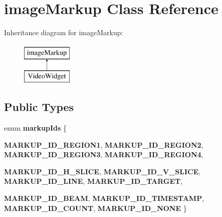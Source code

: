 \hypertarget{classimageMarkup}{
\section{imageMarkup Class Reference}
\label{classimageMarkup}
}
Inheritance diagram for imageMarkup:\begin{figure}[H]
\begin{center}
\leavevmode
\includegraphics[height=2.000000cm]{classimageMarkup}
\end{center}
\end{figure}
\subsection*{Public Types}
\begin{DoxyCompactItemize}
\item 
enum {\bfseries markupIds} \{ \par
{\bfseries MARKUP\_\-ID\_\-REGION1}, 
{\bfseries MARKUP\_\-ID\_\-REGION2}, 
{\bfseries MARKUP\_\-ID\_\-REGION3}, 
{\bfseries MARKUP\_\-ID\_\-REGION4}, 
\par
{\bfseries MARKUP\_\-ID\_\-H\_\-SLICE}, 
{\bfseries MARKUP\_\-ID\_\-V\_\-SLICE}, 
{\bfseries MARKUP\_\-ID\_\-LINE}, 
{\bfseries MARKUP\_\-ID\_\-TARGET}, 
\par
{\bfseries MARKUP\_\-ID\_\-BEAM}, 
{\bfseries MARKUP\_\-ID\_\-TIMESTAMP}, 
{\bfseries MARKUP\_\-ID\_\-COUNT}, 
{\bfseries MARKUP\_\-ID\_\-NONE}
 \}
\end{DoxyCompactItemize}
